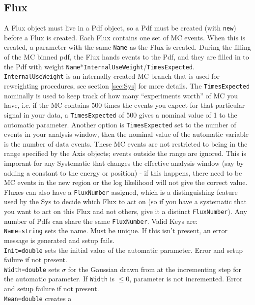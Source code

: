\subsection{Flux}
\label{sec:Flux}
A Flux object must live in a Pdf object, so a Pdf must be created
(with \verb|new|) before a Flux is created.  Each Flux contains one
set of MC events.  When this is created, a parameter with the same
\verb|Name| as the Flux is created.  During the filling of the MC
binned pdf, the Flux hands events to the Pdf, and they are filled in
to the Pdf with weight
\verb|Name|*\verb|InternalUseWeight|/\verb|TimesExpected|.
\verb|InternalUseWeight| is an internally created MC branch that is
used for reweighting procedures, see section \ref{sec:Sys} for more
details.  The \verb|TimesExpected| nominally is used to keep track of
how many ``experiments worth'' of MC you have, i.e. if the MC contains
500 times the events you expect for that particular signal in your
data, a \verb|TimesExpected| of 500 gives a nominal value of 1 to the
automatic parameter.  Another option is \verb|TimesExpected| set to
the number of events in your analysis window, then the nominal value
of the automatic variable is the number of data events.  These MC
events are not restricted to being in the range specified by the Axis
objects; events outside the range are ignored.  This is imporant for
any Systematic that changes the effective analysis window (say by
adding a constant to the energy or position) - if this happens, there
need to be MC events in the new region or the log likelihood will not
give the correct value.  Fluxes can also have a \verb|FluxNumber|
assigned, which is a distinguishing feature used by the Sys to decide
which Flux to act on (so if you have a systematic that you want to act
on this Flux and not others, give it a distinct \verb|FluxNumber|).
Any number of Pdfs can share the same \verb|FluxNumber|.  Valid Keys
are:\medskip\\ 
\verb|Name=string| sets the name.  Must be unique.  If
this isn't present, an error message is generated and setup
fails. \medskip\\ 
\verb|Init=double| sets the initial value of the
automatic parameter.  Error and setup failure if not
present.\medskip\\ 
\verb|Width=double| sets $\sigma$ for the Gaussian
drawn from at the incrementing step for the automatic parameter.  If
\verb|Width| is $\leq 0$, parameter is not incremented.  Error and
setup failure if not present.\medskip\\ 
\verb|Mean=double| creates a
